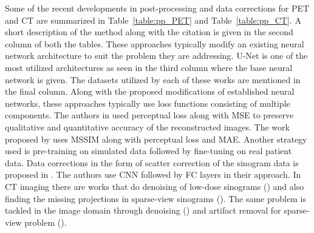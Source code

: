 Some of the recent developments in post-processing and data corrections for \ac{PET} and \ac{CT} are summarized in Table~\ref{table:pp_PET} and Table~\ref{table:pp_CT}. A short description of the method along with the citation is given in the second column of both the tables. These approaches typically modify an existing neural network architecture to suit the problem they are addressing. U-Net is one of the most utilized architectures as seen in the third column where the base neural network is given. The datasets utilized by each of these works are mentioned in the final column. Along with the proposed modifications of established neural networks, these approaches typically use loss functions consisting of multiple components. The authors in \cite{gong2018pet} used perceptual loss along with \ac{MSE} to preserve qualitative and quantitative accuracy of the reconstructed images. The work proposed by \cite{whiteley2020fastpet} uses \ac{MSSIM} along with perceptual loss and \ac{MAE}. Another strategy used is pre-training on simulated data followed by fine-tuning on real patient data. Data corrections in the form of scatter correction of the sinogram data is proposed in \cite{qian2017deep}. The authors use \ac{CNN} followed by \ac{FC} layers in their approach. In \ac{CT} imaging there are works that do denoising of low-dose sinograms (\cite{ma2021sinogram,zhu2020low}) and also finding the missing projections in sparse-view sinograms (\cite{lee2018deep}). The same problem is tackled in the image domain through denoising (\cite{yang2018low}) and artifact removal for sparse-view problem (\cite{jin2017deep,xie2018artifact,zhang2018sparse}).
